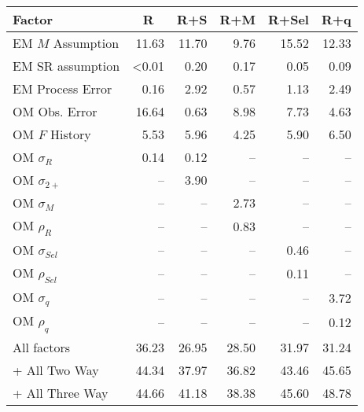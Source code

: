 \begin{center}
\begin{tabular}{lrrrrr}
\hline\hline
\multicolumn{1}{l}{Factor}&\multicolumn{1}{c}{R}&\multicolumn{1}{c}{R+S}&\multicolumn{1}{c}{R+M}&\multicolumn{1}{c}{R+Sel}&\multicolumn{1}{c}{R+q}\tabularnewline
\hline
EM $M$ Assumption&11.63&11.70& 9.76&15.52&12.33\tabularnewline
EM SR assumption&\textless  0.01& 0.20& 0.17& 0.05& 0.09\tabularnewline
EM Process Error& 0.16& 2.92& 0.57& 1.13& 2.49\tabularnewline
OM Obs. Error&16.64& 0.63& 8.98& 7.73& 4.63\tabularnewline
OM $F$ History& 5.53& 5.96& 4.25& 5.90& 6.50\tabularnewline
OM $\sigma_R$& 0.14& 0.12&--&--&--\tabularnewline
OM $\sigma_{2+}$ &--& 3.90&--&--&--\tabularnewline
OM $\sigma_M$&--&--& 2.73&--&--\tabularnewline
OM $\rho_R$&--&--& 0.83&--&--\tabularnewline
OM $\sigma_{Sel}$&--&--&--& 0.46&--\tabularnewline
OM $\rho_{Sel}$&--&--&--& 0.11&--\tabularnewline
OM $\sigma_q$&--&--&--&--& 3.72\tabularnewline
OM $\rho_q$&--&--&--&--& 0.12\tabularnewline
All factors&36.23&26.95&28.50&31.97&31.24\tabularnewline
+ All Two Way&44.34&37.97&36.82&43.46&45.65\tabularnewline
+ All Three Way&44.66&41.18&38.38&45.60&48.78\tabularnewline
\hline
\end{tabular}\end{center}
